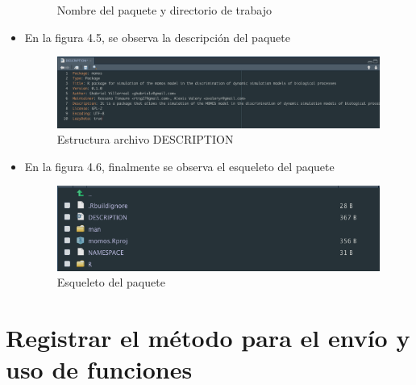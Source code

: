 \begin{itemize}
\begin{figure}[H]
\begin{minipage}{0.8\textwidth}
            \caption{Nombre del paquete y directorio de trabajo}
            \label{fig:descripcion}
          \end{minipage}%
          \hspace{5mm}
    \end{figure}
    \item En la figura 4.5, se observa la descripci\'on del paquete
    \begin{figure}[H]
        \centering
          \begin{minipage}{0.8\textwidth}
            \centering
            \includegraphics[width=1\textwidth]{figure_4_5.png}
            \caption{Estructura archivo DESCRIPTION}
            \label{fig:descripcion}
          \end{minipage}%
          \hspace{5mm}
    \end{figure}
    \item En la figura 4.6, finalmente se observa el esqueleto del paquete
    \begin{figure}[H]
        \centering
          \begin{minipage}{0.8\textwidth}
            \centering
            \includegraphics[width=1\textwidth]{figure_4_6.png}
            \caption{Esqueleto del paquete}
            \label{fig:descripcion}
          \end{minipage}%
          \hspace{5mm}
    \end{figure}
\end{itemize}

\noindent

\section{Registrar el m\'etodo para el env\'io y uso de funciones}

